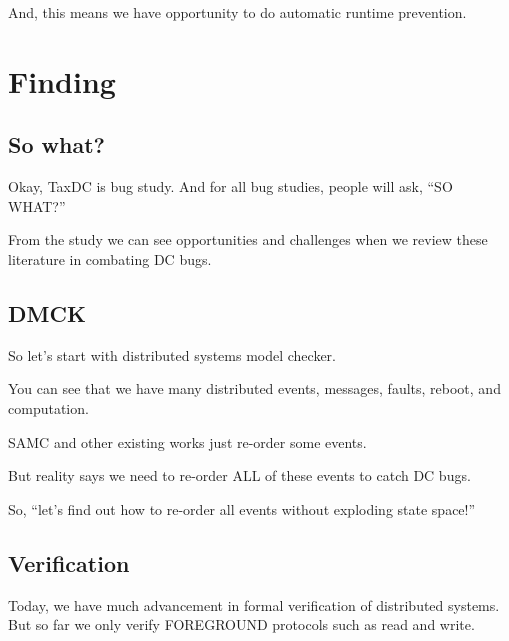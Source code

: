 And, this means we have opportunity to do automatic runtime prevention. 


\section{Finding}



\subsection{So what?}

Okay, TaxDC is bug study. And for all bug studies, people will ask, ``SO
WHAT?''

From the study we can see opportunities and challenges when we review these
literature in combating DC bugs.



\subsection{DMCK}

So let's start with distributed systems model checker. 

You can see that we have many distributed events, messages, faults, reboot, and
computation.

SAMC and other existing works just re-order some events.

But reality says we need to re-order ALL of these events to catch DC bugs.

So, ``let's find out how to re-order all events without exploding state
space!''

\subsection{Verification}

Today, we have much advancement in formal verification of distributed systems.
But so far we only verify FOREGROUND protocols such as read and write. 

